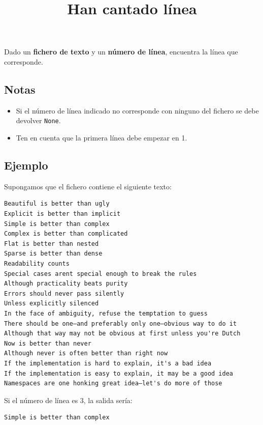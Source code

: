 \documentclass[12pt,a4paper]{article}
\title{\textbf{Han cantado línea}}
\begin{document}
\maketitle

Dado un \textbf{fichero de texto} y un \textbf{número de línea}, encuentra la línea que corresponde.

\subsection*{Notas}

\begin{itemize}
    \item Si el número de línea indicado no corresponde con ninguno del fichero se debe devolver \texttt{None}.
    \item Ten en cuenta que la primera línea debe empezar en 1.
\end{itemize}

\subsection*{Ejemplo}

Supongamos que el fichero contiene el siguiente texto:

\begin{verbatim}
Beautiful is better than ugly
Explicit is better than implicit
Simple is better than complex
Complex is better than complicated
Flat is better than nested
Sparse is better than dense
Readability counts
Special cases arent special enough to break the rules
Although practicality beats purity
Errors should never pass silently
Unless explicitly silenced
In the face of ambiguity, refuse the temptation to guess
There should be one—and preferably only one—obvious way to do it
Although that way may not be obvious at first unless you're Dutch
Now is better than never
Although never is often better than right now
If the implementation is hard to explain, it's a bad idea
If the implementation is easy to explain, it may be a good idea
Namespaces are one honking great idea—let's do more of those
\end{verbatim}

Si el número de línea es 3, la salida sería:

\begin{verbatim}
Simple is better than complex
\end{verbatim}
\end{document}
